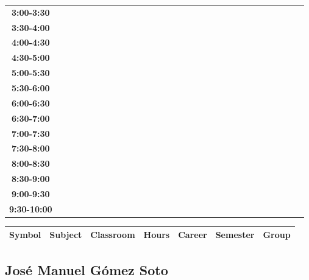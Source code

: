 \documentclass{article}
\begin{document}
\begin{table}[ht]
\begin{tabular}{|c|c|c|c|c|c|c|c|c|c|c|c|c|c|c|c|c|c|c|c|c|c|c|c|c|c|c|c|c|c|}
 \cline{1-8} 
\textbf{3:00-3:30} &   &   &   &   &   &   &   \\
 \cline{1-8} 
\textbf{3:30-4:00} &   &   &   &   &   &   &   \\
 \cline{1-8} 
\textbf{4:00-4:30} &   &   &   &   &   &   &   \\
 \cline{1-8} 
\textbf{4:30-5:00} &   &   &   &   &   &   &   \\
 \cline{1-8} 
\textbf{5:00-5:30} &   &   &   &   &   &   &   \\
 \cline{1-8} 
\textbf{5:30-6:00} &   &   &   &   &   &   &   \\
 \cline{1-8} 
\textbf{6:00-6:30} &   &   &   &   &   &   &   \\
 \cline{1-8} 
\textbf{6:30-7:00} &   &   &   &   &   &   &   \\
 \cline{1-8} 
\textbf{7:00-7:30} &   &   &   &   &   &   &   \\
 \cline{1-8} 
\textbf{7:30-8:00} &   &   &   &   &   &   &   \\
 \cline{1-8} 
\textbf{8:00-8:30} &   &   &   &   &   &   &   \\
 \cline{1-8} 
\textbf{8:30-9:00} &   &   &   &   &   &   &   \\
 \cline{1-8} 
\textbf{9:00-9:30} &   &   &   &   &   &   &   \\
 \cline{1-8} 
\textbf{9:30-10:00} &   &   &   &   &   &   &   \\
 \cline{1-8} 
\end{tabular}\end{table}

        
        \begin{tabular}{|>{\centering\arraybackslash}m{2cm}|>{\centering\arraybackslash}m{4cm}|>{\centering\arraybackslash}m{2cm}|>{\centering\arraybackslash}m{2cm}|>{\centering\arraybackslash}m{2cm}|>{\centering\arraybackslash}m{2cm}|>{\centering\arraybackslash}m{2cm}|}
        \hline
        \textbf{Symbol} & \textbf{Subject} & \textbf{Classroom} & \textbf{Hours} & \textbf{Career} & \textbf{Semester} & \textbf{Group} \\
        \hline
        \end{tabular}
                    

        \newpage
        

        \subsection{Jos\'e Manuel G\'omez Soto}
        \vspace*{.1cm}
        
\end{document}
